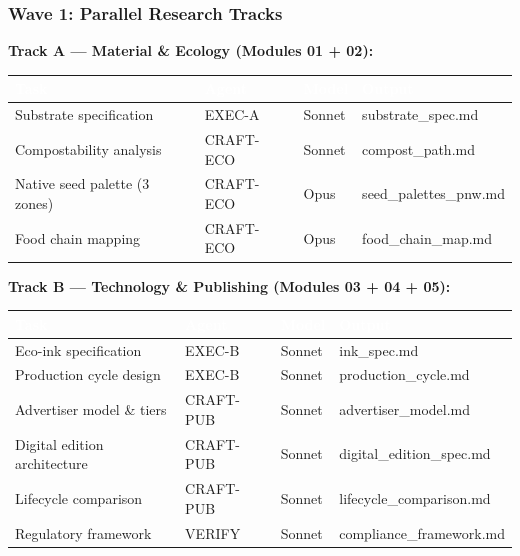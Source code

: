 \documentclass[11pt,letterpaper]{article}
\newcommand{\tableheader}[1]{\textbf{\sffamily\textcolor{white}{#1}}}
\begin{document}
\subsubsection{Wave 1: Parallel Research Tracks}
\textbf{Track A --- Material \& Ecology (Modules 01 + 02):}
\begin{center}
\begin{tabularx}{\textwidth}{L{3cm}L{2.5cm}C{2cm}X}
\toprule
{}
\tableheader{Task} & \tableheader{Agent} & \tableheader{Model} & \tableheader{Output} \\
\midrule
Substrate specification & EXEC-A & Sonnet & substrate\_spec.md \\
Compostability analysis & CRAFT-ECO & Sonnet & compost\_path.md \\
Native seed palette (3 zones) & CRAFT-ECO & Opus & seed\_palettes\_pnw.md \\
Food chain mapping & CRAFT-ECO & Opus & food\_chain\_map.md \\
\bottomrule
\end{tabularx}
\end{center}

\textbf{Track B --- Technology \& Publishing (Modules 03 + 04 + 05):}
\begin{center}
\begin{tabularx}{\textwidth}{L{3cm}L{2.5cm}C{2cm}X}
\toprule
{}
\tableheader{Task} & \tableheader{Agent} & \tableheader{Model} & \tableheader{Output} \\
\midrule
Eco-ink specification & EXEC-B & Sonnet & ink\_spec.md \\
Production cycle design & EXEC-B & Sonnet & production\_cycle.md \\
Advertiser model \& tiers & CRAFT-PUB & Sonnet & advertiser\_model.md \\
Digital edition architecture & CRAFT-PUB & Sonnet & digital\_edition\_spec.md \\
Lifecycle comparison & CRAFT-PUB & Sonnet & lifecycle\_comparison.md \\
Regulatory framework & VERIFY & Sonnet & compliance\_framework.md \\
\bottomrule
\end{tabularx}
\end{center}
\end{document}
